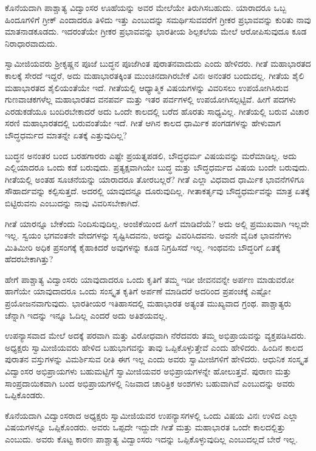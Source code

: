  ಕೊನೆಯದಾಗಿ ಪಾಶ್ಚಾತ್ಯ ವಿದ್ವಾಂಸರ ಊಹೆಯನ್ನು ಅವರ ಮೇಲೆಯೇ ತಿರುಗಿಸಬಹುದು. ಯಾರಾದರೂ ಒಬ್ಬ ಹಿಂದೂಗಳಿಗೆ ಗ್ರೀಕ್ ಎಂದಾದರೂ‌ ತಿಳಿದು ಇತ್ತು ಎಂಬುದನ್ನು ಸಮರ್ಥಿಸುವವರೆಗೆ ಗ್ರೀಕರ ಪ್ರಭಾವವನ್ನು ಕುರಿತು ನಾವು ಮಾತನಾಡಕೂಡದು. ಇದರಂತೆಯೇ ಗ್ರೀಕರ ಪ್ರಭಾವವನ್ನು ಭಾರತೀಯ ಶಿಲ್ಪಕಲೆಯ ಮೇಲೆ ಆರೋಪಿಸುವುದೂ ಕೂಡ ನಿರಾಧಾರವಾದುದು. 

 ಸ್ವಾಮೀಜಿಯವರು ಶ‍್ರೀಕೃಷ್ಣನ ಪೂಜೆ ಬುದ್ಧನ ಪೂಜೆಗಿಂತ ಪುರಾತನವಾದುದು ಎಂದು ಹೇಳಿದರು. ಗೀತೆ ಮಹಾಭಾರತದ ಕಾಲಕ್ಕೆ ಸೇರದೆ ಇದ್ದರೆ, ಅದು ಮಹಾಭಾರತಕ್ಕಿಂತ ಮುಂಚಿನದಾಗಿರಬೇಕೆ ವಿನಃ ಅನಂತರ ಬಂದುದಲ್ಲ. ಗೀತೆಯ ಶೈಲಿ ಮಹಾಭಾರತದ ಶೈಲಿಯಂತೆಯೇ ಇದೆ. ಗೀತೆಯಲ್ಲಿ ಆಧ್ಯಾತ್ಮಿಕ ವಿಷಯಗಳನ್ನು ವಿವರಿಸಲು ಉಪಯೋಗಿಸಿರುವ ಗುಣವಾಚಕಗಳೆಲ್ಲ ಮಹಾಭಾರತದ ವನಪರ್ವ ಮತ್ತು ಇತರ ಪರ್ವಗಳಲ್ಲಿ ಉಪಯೋಗಿಸಲ್ಪಟ್ಟಿವೆ. ಹೀಗೆ ಪದಗಳು ಎರಡುಕಡೆಯೂ ಬಂದಿರಬೇಕಾದರೆ ಅದು ಒಂದೇ ಕಾಲದಲ್ಲಿ ಬರೆದ ಹೊರತು ಸಾಧ್ಯವಿಲ್ಲ. ಗೀತೆಯಲ್ಲಿ ಬರುವ ವಿಚಾರ ಸರಣಿ ಮಹಾಭಾರತದಲ್ಲಿ ಬರುವಂತೆಯೇ ಇದೆ. ಗೀತೆ ಆಗಿನ ಕಾಲದ ಧಾರ್ಮಿಕ ಪಂಗಡಗಳನ್ನು ಹೇಳುವಾಗ ಬೌದ್ಧಧರ್ಮದ ಮಾತನ್ನೇ ಏತಕ್ಕೆ ಎತ್ತುವುದಿಲ್ಲ? 

 ಬುದ್ಧನ ಅನಂತರ ಬಂದ ಬರಹಗಾರರು ಎಷ್ಟೇ ಪ್ರಯತ್ನಪಡಲಿ, ಬೌದ್ಧಧರ್ಮ ವಿಷಯವನ್ನು ಮರೆಮಾಡಿಲ್ಲ. ಅದು ಎಲ್ಲಿಯಾದರೂ ಒಂದು ಕಡೆ ಬರುವುದು. ಪ್ರತ್ಯಕ್ಷವಾಗಿಯೇ ಬುದ್ಧ ಮತ್ತು ಬೌದ್ಧಧರ್ಮದ ವಿಷಯ ಬಂದೇ ಬರುವುದು. ಗೀತೆಯಲ್ಲಿ ಅಂತಹ ಸೂಚನೆಯನ್ನು ಯಾರಾದರೂ ತೋರಬಲ್ಲರೆ? ಗೀತೆ ಎಲ್ಲಾ ವಿಧವಾದ ಧಾರ್ಮಿಕ ಭಾವನೆಗಳಿಗೂ ಸೌಹಾರ್ದವನ್ನು ಕಲ್ಪಿಸುತ್ತದೆ. ಅದರಲ್ಲಿ ಯಾವುದನ್ನೂ ದೂರುವುದಿಲ್ಲ. ಗೀತಾಕರ್ತೃವು ಬೌದ್ಧಧರ್ಮವನ್ನು ಮಾತ್ರ ಏತಕ್ಕೆ ಬಿಟ್ಟಿರುವನು ಎಂಬುದನ್ನು ನಾವು ವಿವರಿಸಬೇಕಾಗಿದೆ.

 ಗೀತೆ ಯಾರನ್ನೂ ಬೇಕೆಂದು ನಿಂದಿಸುವುದಿಲ್ಲ. ಅಂಜಿಕೆಯಿಂದ ಹೀಗೆ ಮಾಡಿದೆಯೆ? ಅದು ಅಲ್ಲಿ ಪ್ರಮುಖವಾಗಿ ಇಲ್ಲವೇ ಇಲ್ಲ. ಸ್ವಯಂ ಭಗವಂತನೇ ವೇದಗಳನ್ನು ಸೃಷ್ಟಿಸಿದವನು, ಅದನ್ನು ವಿವರಿಸಿದವನು. ಅವನೇ ವೈದಿಕ ಭಾವನೆಗಳು ಮಿತಿಮೀರಿ ಅಧಿಕ ಪ್ರಸಂಗಕ್ಕೆ ಕೈಹಾಕಿದರೆ ಅವುಗಳನ್ನು ಕೂಡ ನಿಗ್ರಹಿಸದೆ ಇಲ್ಲ. ಇಂಥವನು ಬೌದ್ಧರಿಗೆ ಏತಕ್ಕೆ ಹೆದರಬೇಕಾಗಿತ್ತು? 

\newpage

 ಹೇಗೆ ಪಾಶ್ಚಾತ್ಯ ವಿದ್ವಾಂಸರು ಯಾವುದಾದರೂ ಒಂದು ಕೃತಿಗೆ ತಮ್ಮ ಇಡೀ ಜೀವನವನ್ನೇ ಅರ್ಪಣ ಮಾಡುವರೋ ಹಾಗೆಯೇ ಯಾವುದಾದರೂ ಒಂದು ಸಂಸ್ಕೃತ ಕೃತಿಗೆ ಅರ್ಪಣೆ ಮಾಡಿದರೆ ಅದರಿಂದ ಪ್ರಪಂಚಕ್ಕೆ ಎಷ್ಟೋ ಪ್ರಯೋಜನವಾಗುವುದು. ಭಾರತೀಯರ ಇತಿಹಾಸದಲ್ಲಿ ಮಹಾಭಾರತ ಅತ್ಯಂತ ಮುಖ್ಯವಾದ ಗ್ರಂಥ. ಪಾಶ್ಚಾತ್ಯರು ಚೆನ್ನಾಗಿ ಇದನ್ನು ಇನ್ನೂ ಓದಿಲ್ಲ ಎಂದರೆ ಅದು ಅತಿಶಯವಲ್ಲ. 

 ಉಪನ್ಯಾಸವಾದ ಮೇಲೆ ಅದಕ್ಕೆ ಪರವಾಗಿ ಮತ್ತು ವಿರೋಧವಾಗಿ ನೆರೆದವರು ತಮ್ಮ ಅಭಿಪ್ರಾಯವನ್ನು ವ್ಯಕ್ತಪಡಿಸಿದರು. ಅಧ್ಯಕ್ಷರು ಸ್ವಾಮೀಜಿಯವರು ಹೇಳಿದ ಬಹುಭಾಗವನ್ನು ತಾವು ಒಪ್ಪಿಕೊಳ್ಳುತ್ತೇವೆ ಎಂದು ಹೇಳಿದರು. ಹಿಂದಿನ ಕಾಲದ ಪುರಾತನ ವಸ್ತುಗಳನ್ನು ವಿಮರ್ಶಿಸುವ ರೀತಿ ಈಗ ಇಲ್ಲ ಎಂದು ಅವರು ಸ್ವಾಮೀಜಿಗಳಿಗೆ ಹೇಳಿದರು. ಆಧುನಿಕ ಸಂಸ್ಕೃತ ವಿದ್ವಾಂಸರ ಅಭಿಪ್ರಾಯಗಳು ಬಹುಮಟ್ಟಿಗೆ ಸ್ವಾಮೀಜಿಯವರ ಅಭಿಪ್ರಾಯಗಳನ್ನೇ ಹೋಲುತ್ತವೆ. ಪುರಾಣ ಮತ್ತು ಸಾಂಪ್ರದಾಯಿಕವಾಗಿ ಬಂದ ಅಭಿಪ್ರಾಯಗಳಲ್ಲಿ ನಿಜವಾದ ಚಾರಿತ್ರಿಕ ಅಂಶಗಳು ಬಹುವಾಗಿವೆ ಎಂಬುದನ್ನು ಅವರು ಒಪ್ಪಿಕೊಂಡರು. 

 ಕೊನೆಯದಾಗಿ ವಿದ್ವಾಂಸರಾದ ಅಧ್ಯಕ್ಷರು ಸ್ವಾಮೀಜಿಯವರ ಉಪನ್ಯಾಸಗಳಲ್ಲಿ ಒಂದು ವಿಷಯ ವಿನಃ ಉಳಿದ ಎಲ್ಲಾ ವಿಷಯಗಳನ್ನೂ ಒಪ್ಪಿಕೊಂಡರು. ಅವರು ಒಪ್ಪದೇ ಇದ್ದುದೇ ಗೀತೆ ಮತ್ತು ಮಹಾಭಾರತ ಒಂದೇ ಕಾಲದಲ್ಲಿತ್ತು ಎಂಬುದು. ಅವರು ಕೊಟ್ಟ ಕಾರಣ ಪಾಶ್ಚಾತ್ಯ ವಿದ್ವಾಂಸರು ಇದನ್ನು ಒಪ್ಪಿಕೊಳ್ಳುವುದಿಲ್ಲ ಎಂಬುದಲ್ಲದೆ ಬೇರೆ ಇಲ್ಲ. 

